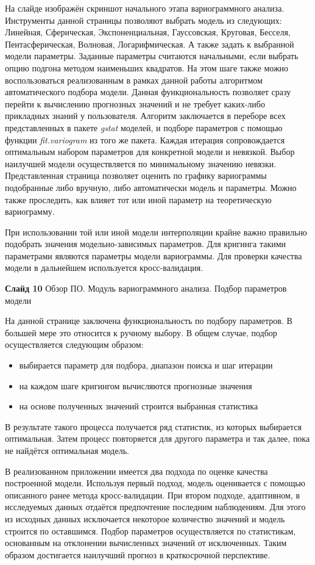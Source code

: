 \documentclass[a4paper,10pt]{report}
\begin{document}
На слайде изображён скриншот начального этапа вариограммного анализа. Инструменты данной страницы позволяют выбрать модель из следующих: Линейная, Сферическая, Экспоненциальная, Гауссовская, Круговая, Бесселя, Пентасферическая, Волновая, Логарифмическая. А также задать к выбранной модели параметры. Заданные параметры считаются начальными, если выбрать опцию подгона методом наименьших квадратов. На этом шаге также можно воспользоваться реализованным в рамках данной работы алгоритмом автоматического подбора модели. Данная функциональность позволяет сразу перейти к вычислению прогнозных значений и не требует каких-либо прикладных знаний у пользователя. Алгоритм заключается в переборе всех представленных в пакете \textit{gstat} моделей, и подборе параметров с помощью функции \textit{fit.variogram} из того же пакета. Каждая итерация сопровождается оптимальным набором параметров для конкретной модели и невязкой. Выбор наилучшей модели осуществляется по минимальному значению невязки. Представленная страница позволяет оценить по графику вариограммы подобранные либо вручную, либо автоматически модель и параметры. Можно также проследить, как влияет тот или иной параметр на теоретическую вариограмму.

При использовании той или иной модели интерполяции крайне важно правильно подобрать значения модельно-зависимых параметров. Для кригинга такими параметрами являются параметры модели вариограммы. Для проверки качества модели в дальнейшем используется кросс-валидация.

\textbf{Слайд 10} Обзор ПО. Модуль вариограммного анализа. Подбор параметров модели

На данной странице заключена функциональность по подбору параметров. В большей мере это относится к ручному выбору. В общем случае, подбор осуществляется следующим образом:
\begin{itemize}
	\item выбирается параметр для подбора, диапазон поиска и шаг итерации
	\item на каждом шаге кригингом вычисляются прогнозные значения
	\item на основе полученных значений строится выбранная статистика
\end{itemize}
В результате такого процесса получается ряд статистик, из которых выбирается оптимальная. Затем процесс повторяется для другого параметра и так далее, пока не найдётся оптимальная модель.

В реализованном приложении имеется два подхода по оценке качества построенной модели. Используя первый подход, модель оценивается с помощью описанного ранее метода кросс-валидации. При втором подходе, адаптивном, в исследуемых данных отдаётся предпочтение последним наблюдениям. Для этого из исходных данных исключается некоторое количество значений и модель строится по оставшимся. Подбор параметров осуществляется по статистикам, основанным на отклонении вычисленных значений от исключенных. Таким образом достигается наилучший прогноз в краткосрочной перспективе.
\end{document}
